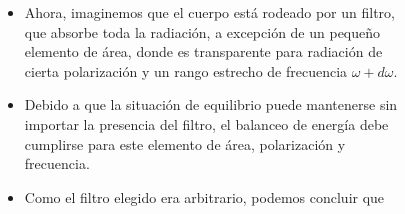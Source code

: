 \documentclass[aspectratio=1610]{beamer}
\begin{document}
\begin{frame}
	\begin{columns}
		\begin{itemize}
			\item Ahora, imaginemos que el cuerpo está rodeado por un filtro, que absorbe toda la radiación, a excepción de un pequeño elemento de área, donde es transparente para radiación de cierta polarización y un rango estrecho de frecuencia $\omega+d\omega$.\pause
			\item Debido a que la situación de equilibrio puede mantenerse sin importar la presencia del filtro, el balanceo de energía debe cumplirse para este elemento de área, polarización y frecuencia.\pause
			\item Como el filtro elegido era arbitrario, podemos concluir que
		\end{itemize}
		
		\begin{figure}
			\centering
			
			
			
			\begin{tikzpicture}[x=0.75pt,y=0.75pt,yscale=-.76,xscale=.76]
				

\end{tikzpicture}
\end{figure}
\end{columns}
\end{frame}
\end{document}
